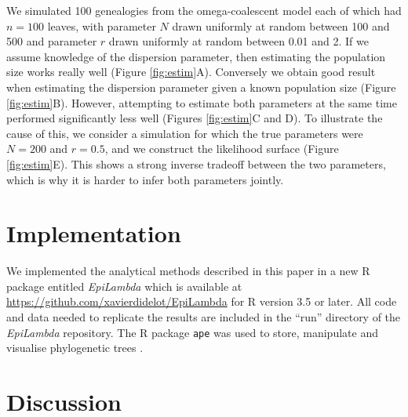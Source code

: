 \documentclass{article}
\begin{document}
We simulated 100 genealogies from the omega-coalescent model each of which had
$n=100$ leaves, with parameter $N$ drawn uniformly at random between 100 and 500
and parameter $r$ drawn uniformly at random between 0.01 and 2.
If we assume knowledge of the dispersion parameter, then estimating the population size 
works really well (Figure \ref{fig:estim}A). Conversely we obtain good result when 
estimating the dispersion parameter given a known population size 
(Figure \ref{fig:estim}B). However, attempting to estimate both parameters at the same
time performed significantly less well (Figures \ref{fig:estim}C and D). 
To illustrate the cause of this, we consider a simulation for which the true 
parameters were $N=200$ and $r=0.5$, 
and we construct the likelihood surface (Figure \ref{fig:estim}E).
This shows a strong inverse tradeoff between the two parameters, which is
why it is harder to infer both parameters jointly.

\section{Implementation}

We implemented the analytical methods described in this paper in a 
new R package entitled \emph{EpiLambda} which is available
at \url{https://github.com/xavierdidelot/EpiLambda} for R version 3.5 or later. 
All code and data needed to replicate the results are included in the ``run'' directory of the \emph{EpiLambda} repository.
The R package \verb+ape+ was used to store, manipulate and visualise phylogenetic trees
\citep{Paradis2019}.

\section{Discussion}
\end{document}
